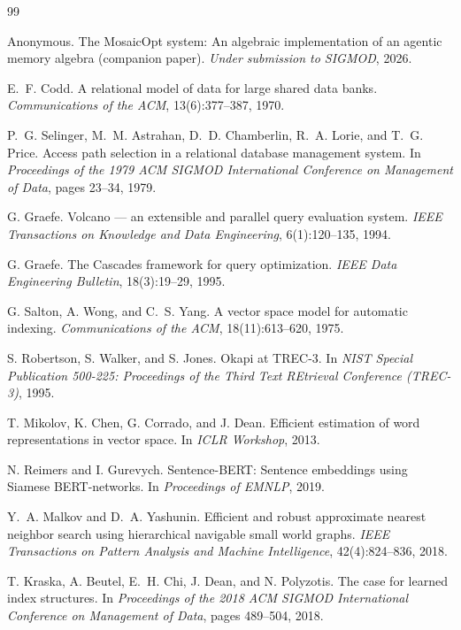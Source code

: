 \documentclass[acmsmall,review,anonymous]{acmart}
\theoremstyle{plain}
\theoremstyle{definition}
\theoremstyle{remark}
\begin{document}
\begin{thebibliography}{99}

Anonymous.
\newblock The MosaicOpt system: An algebraic implementation of an
agentic memory algebra (companion paper).
\newblock \emph{Under submission to SIGMOD}, 2026.

E.~F. Codd.
\newblock A relational model of data for large shared data banks.
\newblock \emph{Communications of the ACM}, 13(6):377--387, 1970.

P.~G. Selinger, M.~M. Astrahan, D.~D. Chamberlin, R.~A. Lorie, and
T.~G. Price.
\newblock Access path selection in a relational database management
system.
\newblock In \emph{Proceedings of the 1979 ACM SIGMOD International
Conference on Management of Data}, pages 23--34, 1979.

G. Graefe.
\newblock Volcano --- an extensible and parallel query evaluation
system.
\newblock \emph{IEEE Transactions on Knowledge and Data Engineering},
6(1):120--135, 1994.

G. Graefe.
\newblock The Cascades framework for query optimization.
\newblock \emph{IEEE Data Engineering Bulletin}, 18(3):19--29, 1995.

G. Salton, A. Wong, and C.~S. Yang.
\newblock A vector space model for automatic indexing.
\newblock \emph{Communications of the ACM}, 18(11):613--620, 1975.

S. Robertson, S. Walker, and S. Jones.
\newblock Okapi at TREC-3.
\newblock In \emph{NIST Special Publication 500-225: Proceedings of
the Third Text REtrieval Conference (TREC-3)}, 1995.

T. Mikolov, K. Chen, G. Corrado, and J. Dean.
\newblock Efficient estimation of word representations in vector space.
\newblock In \emph{ICLR Workshop}, 2013.

N. Reimers and I. Gurevych.
\newblock Sentence-BERT: Sentence embeddings using Siamese
BERT-networks.
\newblock In \emph{Proceedings of EMNLP}, 2019.

Y.~A. Malkov and D.~A. Yashunin.
\newblock Efficient and robust approximate nearest neighbor search
using hierarchical navigable small world graphs.
\newblock \emph{IEEE Transactions on Pattern Analysis and Machine
Intelligence}, 42(4):824--836, 2018.

T. Kraska, A. Beutel, E.~H. Chi, J. Dean, and N. Polyzotis.
\newblock The case for learned index structures.
\newblock In \emph{Proceedings of the 2018 ACM SIGMOD International
Conference on Management of Data}, pages 489--504, 2018.


\end{thebibliography}
\end{document}
